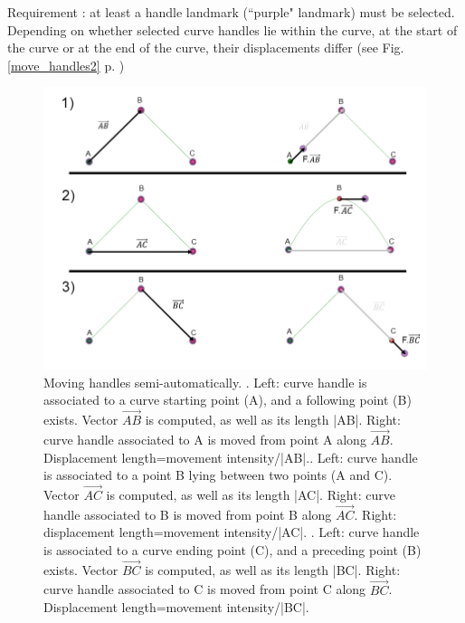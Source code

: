 Requirement : at least a handle landmark (``purple" landmark) must be selected.
Depending on whether selected curve handles lie within the curve, at the start of the curve or at the
end of the curve, their displacements differ (see Fig. \ref{move_handles2} p. \pageref{move_handles2})




\begin{figure}
  \centering
  \includegraphics[scale=0.7]{images/10/fig_disp.png} 
	\caption{ Moving handles semi-automatically. . Left: curve handle is associated to a curve starting point (A), and a following point (B) exists. Vector $\overrightarrow{AB}$ is computed, as well as its length |AB|. Right: curve handle associated to A is moved from point A along $\overrightarrow{AB}$. Displacement length=movement intensity/|AB|.. Left: curve handle is associated to a point B lying between two points (A and C). Vector $\overrightarrow{AC}$ is computed, as well as its length |AC|. Right: curve handle associated to B is moved from point B along $\overrightarrow{AC}$. Right: displacement length=movement intensity/|AC|.  . Left: curve handle is associated to a curve ending point (C), and a preceding point (B) exists. Vector $\overrightarrow{BC}$ is computed, as well as its length |BC|. Right: curve handle associated to C is moved from point C along $\overrightarrow{BC}$. Displacement length=movement intensity/|BC|. }
	
\label{move_handles}
 
\end{figure}

